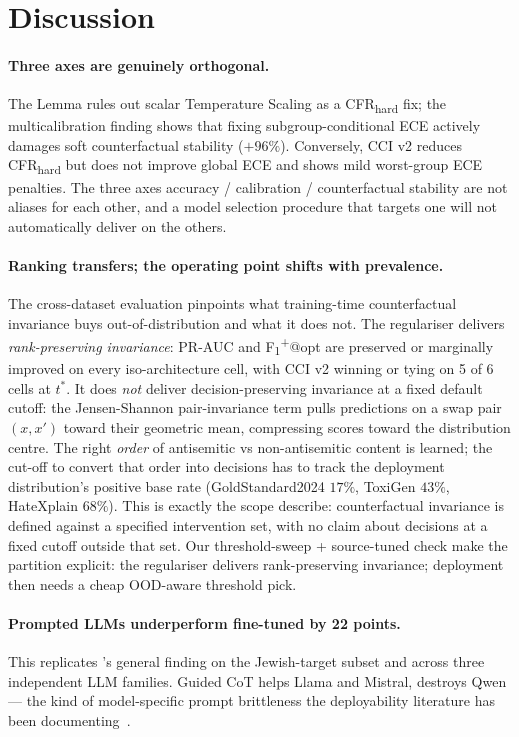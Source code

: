 \documentclass[10pt,a4paper]{article}
\begin{document}
\section{Discussion}

\paragraph{Three axes are genuinely orthogonal.} The Lemma rules out scalar
Temperature Scaling as a CFR\textsubscript{hard} fix; the multicalibration
finding shows that fixing subgroup-conditional ECE actively damages
soft counterfactual stability ($+96\%$). Conversely, CCI v2 reduces
CFR\textsubscript{hard} but does not improve global ECE and shows mild
worst-group ECE penalties. The three axes accuracy / calibration /
counterfactual stability are not aliases for each other, and a model
selection procedure that targets one will not automatically deliver on
the others.

\paragraph{Ranking transfers; the operating point shifts with prevalence.}
The cross-dataset evaluation pinpoints what training-time counterfactual
invariance buys out-of-distribution and what it does not. The regulariser
delivers \emph{rank-preserving invariance}: PR-AUC and
F\textsubscript{1}\textsuperscript{+}@opt are preserved or marginally
improved on every iso-architecture cell, with CCI v2 winning or tying
on 5 of 6 cells at $t^*$. It does \emph{not} deliver
decision-preserving invariance at a fixed default cutoff: the
Jensen-Shannon pair-invariance term pulls predictions on a swap pair
$(x, x')$ toward their geometric mean, compressing scores toward the
distribution centre. The right \emph{order} of antisemitic vs
non-antisemitic content is learned; the cut-off to convert that order
into decisions has to track the deployment distribution's positive
base rate (GoldStandard2024 $17\%$, ToxiGen $43\%$, HateXplain $68\%$).
This is exactly the scope \citet{veitch2021counterfactual} describe:
counterfactual invariance is defined against a specified intervention
set, with no claim about decisions at a fixed cutoff outside that set.
Our threshold-sweep + source-tuned check make the partition explicit:
the regulariser delivers rank-preserving invariance; deployment then
needs a cheap OOD-aware threshold pick.

\paragraph{Prompted LLMs underperform fine-tuned by 22 points.} This replicates
\citet{patel2025evaluating}'s general finding on the Jewish-target subset
and across three independent LLM families. Guided CoT helps Llama and
Mistral, destroys Qwen --- the kind of model-specific prompt brittleness
the deployability literature has been documenting~\citep{turpin2023language}.
\end{document}
